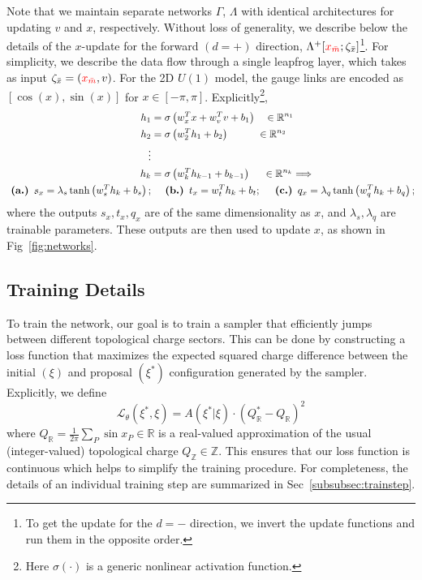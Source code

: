 \documentclass[a4paper,11pt]{article}
\newcommand{\xmaskbar}{\textcolor{red}{x_{\bar{m}}}}
\begin{document}
Note that we maintain separate networks \(\Gamma\), \(\Lambda\) with
identical architectures for updating \(v\) and \(x\), respectively.
%
Without loss of generality, we describe below the details of the \(x\)-update
for the forward \((d = +)\) direction, \(\Lambda^{+}[\xmaskbar;
\zeta_{\bar{x}}]\)\footnote{
    To get the update for the \(d=-\) direction, we invert the
    update functions and run them in the opposite order.
}.
%
For simplicity, we describe the data flow through a single leapfrog layer,
%
which takes as input \(\zeta_{\bar{x}} = (\xmaskbar, v)\).
%
For the 2D \(U(1)\) model, the gauge links are encoded as \([\cos(x),
\sin(x)]\) for \(x \in [-\pi, \pi]\).
%
Explicitly\footnote{
    Here \(\sigma(\cdot)\) is a generic nonlinear activation function.
},
%
\begin{align}
    h_{1} &= \sigma\left(w_{x}^{T} x + w_{v}^{T} v + b_{1}\right)
        \quad \in \mathbb{R}^{n_{1}} \\
    h_{2} &= \sigma\left(w_{2}^{T} h_{1} + b_{2}\right)
        \hspace{0.085\textwidth} \in \mathbb{R}^{n_{2}} \\
    \nonumber \vdots & \\
    h_{k} &= \sigma\left(w_{k}^{T} h_{k-1} + b_{k-1}\right)
        \hspace{0.04\textwidth} \in \mathbb{R}^{n_{k}} \Longrightarrow \\
    \nonumber
    \textbf{  (a.)  } s_{x} = \lambda_{s} \tanh \left( w^{T}_{s} h_{k} + b_{s} \right);
    &\quad\textbf{  (b.)  } t_{x} = w^{T}_{t} h_{k} + b_{t};
    \quad\textbf{  (c.)  } q_{x} = \lambda_{q}\tanh\left(w^{T}_{q} h_{k} + b_{q}\right);
\end{align}
%
where the outputs \(s_{x}, t_{x}, q_{x}\) are of the same dimensionality as
\(x\), and \(\lambda_{s}, \lambda_{q}\) are trainable parameters.
%
These outputs are then used to update \(x\), as shown in
Fig~\ref{fig:networks}.

\subsection{\label{subsec:training}Training Details}
%
To train the network, our goal is to train a sampler that efficiently
jumps between different topological charge sectors.
%
This can be done by constructing a loss function that maximizes the expected
squared charge difference between the initial \((\xi)\) and proposal
\((\xi^{\ast})\) configuration generated by the sampler.
%
Explicitly, we define
%
\begin{equation}
    \mathcal{L}_{\theta}(\xi^{\ast}, \xi) 
    = A(\xi^{\ast}|\xi) \cdot (Q^{\ast}_{\mathbb{R}} - Q_{\mathbb{R}})^{2}
\end{equation}
%
where \(Q_{\mathbb{R}} = \frac{1}{2\pi}\sum_{P} \sin x_{P} \in \mathbb{R}\) is
a real-valued approximation of the usual (integer-valued) topological charge
\(Q_{\mathbb{Z}} \in \mathbb{Z}\).
%
This ensures that our loss function is continuous which helps to simplify the
training procedure.
%
For completeness, the details of an individual training step are summarized in
Sec~\ref{subsubsec:trainstep}.
%
\end{document}
